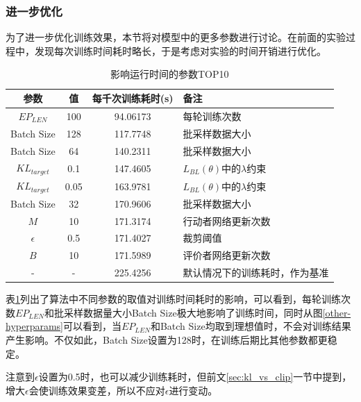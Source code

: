 \documentclass[bachelor]{thesis-uestc}
\begin{document}
	\subsubsection{进一步优化}
	为了进一步优化训练效果，本节将对模型中的更多参数进行讨论。在前面的实验过程中，发现每次训练时间耗时略长，于是考虑对实验的时间开销进行优化。
	
	\begin{table}[htbp]
		\centering
		\caption{影响运行时间的参数TOP10}
		\begin{tabular}{cccl}
			\toprule[1.5pt]
			参数 & 值 & 每千次训练耗时(s) & 备注\\
			\hline
			$EP_{LEN}$ & 100   & 94.06173 & 每轮训练次数\footnotemark[1] \\
			Batch Size & 128   & 117.7748 & 批采样数据大小\footnotemark[2] \\
			Batch Size & 64    & 140.2311 & 批采样数据大小 \\
			$KL_{target}$ & 0.1   & 147.4605 & $L_{BL}(\theta)$中的$
			\lambda$约束\footnotemark[3] \\
			$KL_{target}$ & 0.05  & 163.9781 & $L_{BL}(\theta)$中的$
			\lambda$约束\\
			Batch Size & 32    & 170.9606 & 批采样数据大小\\
			$M$ & 10    & 171.3174 & 行动者网络更新次数 \footnotemark[3]\\
			$\epsilon$ & 0.5   & 171.4027 & 裁剪阈值 \footnotemark[3]\\
			$B$ & 10    & 171.5989 & 评价者网络更新次数 \footnotemark[3]\\
			\hline
			- & - & 225.4256 & 默认情况下的训练耗时，作为基准\\
			\bottomrule[1.5pt]
		\end{tabular}%
		\label{params-table}%
	\end{table}
	
	表\ref{params-table}列出了算法中不同参数的取值对训练时间耗时的影响，可以看到，每轮训练次数$EP_{LEN}$和批采样数据量大小Batch Size极大地影响了训练时间，同时从图\ref{other-hyperparams}可以看到，当$EP_{LEN}$和Batch Size均取到理想值时，不会对训练结果产生影响。不仅如此，Batch Size设置为128时，在训练后期比其他参数都更稳定。
	
	注意到$\epsilon$设置为0.5时，也可以减少训练耗时，但前文\ref{sec:kl_vs_clip}一节中提到，增大$\epsilon$会使训练效果变差，所以不应对$\epsilon$进行变动。
	
\end{document}
